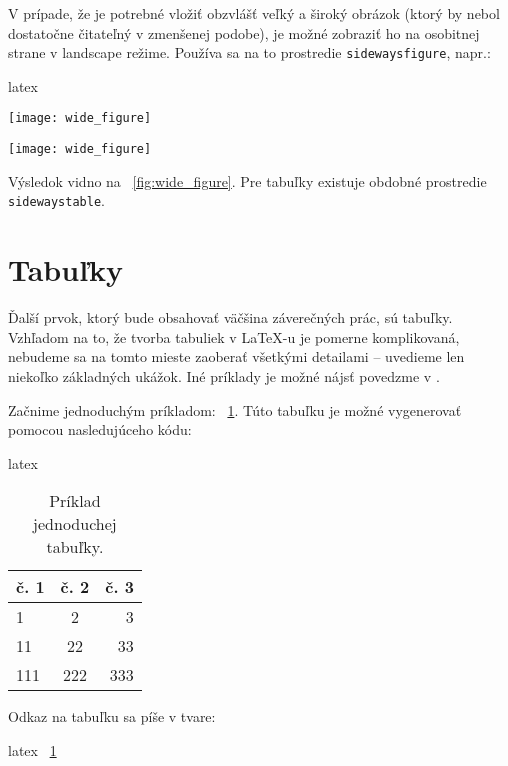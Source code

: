 V prípade, že je potrebné vložiť obzvlášť veľký a široký obrázok (ktorý by nebol dostatočne čitateľný v zmenšenej podobe), je možné zobraziť ho na osobitnej strane v landscape režime. Používa sa na to prostredie \texttt{sidewaysfigure}, napr.:
\begin{inlinecode}{latex}
\begin{sidewaysfigure}[p]
\centering
\texttt{[image: wide\_figure]}
\caption{Obzvlášť veľký a široký obrázok.}
\end{sidewaysfigure}
\end{inlinecode}

\begin{sidewaysfigure}[p]
\centering
\texttt{[image: wide\_figure]}
\caption{Obzvlášť veľký a široký obrázok.}
\label{fig:wide_figure}
\end{sidewaysfigure}

Výsledok vidno na \figurename~\ref{fig:wide_figure}. Pre tabuľky existuje obdobné prostredie \texttt{sidewaystable}.

\section{Tabuľky}

Ďalší prvok, ktorý bude obsahovať väčšina záverečných prác, sú tabuľky. Vzhľadom na to, že tvorba tabuliek v LaTeX-u je pomerne komplikovaná, nebudeme sa na tomto mieste zaoberať všetkými detailami -- uvedieme len niekoľko základných ukážok. Iné príklady je možné nájsť povedzme v \cite{latexTables}.

Začnime jednoduchým príkladom: \tablename~\ref{tab:priklad}. Túto tabuľku je možné vygenerovať pomocou nasledujúceho kódu:
\begin{inlinecode}{latex}
\begin{table}
\centering
\caption{Príklad jednoduchej tabuľky.}
\label{tab:priklad}
\begin{tabular}{|l|c|r|}
\hline
\textbf{č. 1} & \textbf{č. 2} &  \textbf{č. 3} \\
\hline
1 & 2 & 3 \\
11 & 22 & 33 \\
111 & 222 & 333 \\
\hline
\end{tabular}
\end{table}
\end{inlinecode}
Odkaz na tabuľku sa píše v tvare:
\begin{inlinecode}{latex}
\tablename~\ref{tab:priklad}
\end{inlinecode}

